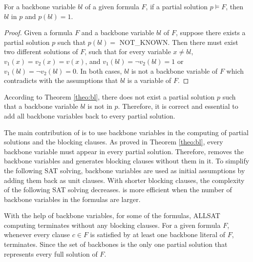 \begin{theorem} \label{theo:bl}
For a backbone variable $bl$ of a given formula $F$, if a partial solution $p\models F$, then $bl$ in $p$ and $p(bl)=1$.
\end{theorem}

\begin{proof}
Given a formula $F$ and a backbone variable $bl$ of $F$, suppose there exists a partial solution $p$ such that $p(bl)=$ NOT\_KNOWN. Then there must exist two different solutions of $F$, such that for every variable $x\neq bl$, $v_1(x)=v_2(x)=v(x)$, and $v_1(bl)=\neg v_2(bl)=1$ or $v_1(bl)=\neg v_2(bl)=0$. In both cases, $bl$ is not a backbone variable of $F$ which contradicts with the assumptions that $bl$ is a variable of $F$.
\end{proof}
According to Theorem \ref{theo:bl}, there does not exist a partial solution $p$ such that a backbone variable $bl$ is not in $p$. Therefore, it is correct and essential to add all backbone variables back to every partial solution.

The main contribution of \tool is to use backbone variables in the computing of partial solutions and the blocking clauses. As proved in Theorem \ref{theo:bl}, every backbone variable must appear in every partial solution. Therefore, \tool removes the backbone variables and generates blocking clauses without them in it. To simplify the following SAT solving, backbone variables are used as initial assumptions by adding them back as unit clauses. With shorter blocking clauses, the complexity of the following SAT solving decreases. \tool is more efficient when the number of backbone variables in the formulas are larger. 

With the help of backbone variables, for some of the formulas, ALLSAT computing terminates without any blocking clauses.
For a given formula $F$, whenever every clause $c\in F$ is satisfied by at least one backbone literal of $F$, \tool terminates. Since the set of backbones is the only one partial solution that represents every full solution of $F$.

